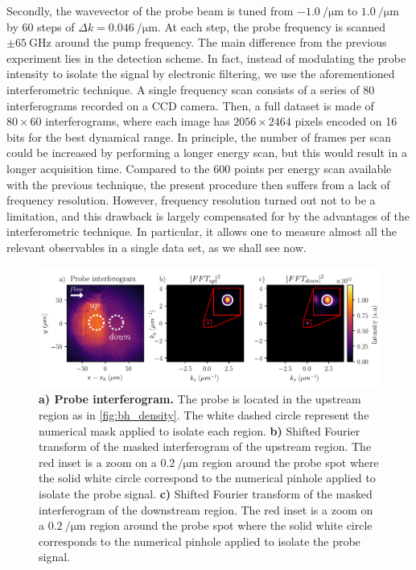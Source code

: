 Secondly, the wavevector of the probe beam is tuned from $\SI{-1.0}{\per \micro \meter}$ to $\SI{1.0}{\per \micro \meter}$ by 60 steps of $\Delta k =\SI{0.046}{\per \micro \meter}$.
At each step, the probe frequency is scanned $\pm \SI{65}{\giga \hertz}$ around the pump frequency. The main difference from the previous experiment lies in the detection scheme. In fact, instead of modulating the probe intensity to isolate the signal by electronic filtering, we use the aforementioned interferometric technique. A single frequency scan consists of a series of 80 interferograms recorded on a CCD camera. Then, a full dataset is made of $80\times 60$ interferograms, where each image has $2056\times 2464$ pixels encoded on 16 bits
for the best dynamical range. In principle, the number of frames per scan could be increased by performing a longer energy scan, but this would result in a longer acquisition time. Compared to the $600$ points per energy scan available with the previous technique,
the present procedure then suffers from a lack of frequency resolution. However, frequency resolution turned out not to be a limitation, and this drawback
is largely compensated for by the advantages of the interferometric technique. In particular, it allows one to measure almost all the relevant observables in a single data set, as we shall see now. 

\begin{figure}
    \centering
    \includegraphics[width=1\textwidth]{chap_stimulated_hawking/fig/fft_bh_fluctu.pdf}
    \caption{\textbf{a) Probe interferogram.} The probe is located in the upstream region as in \autoref{fig:bh_density}. The white dashed circle represent the numerical mask applied to isolate each region.
    \textbf{b)} Shifted Fourier transform of the masked interferogram of the upstream region. The red inset is a zoom on a $\SI{0.2}{\per \micro \meter}$ region around the probe spot where the solid white circle correspond to the numerical pinhole applied to isolate the probe signal.
    \textbf{c)} Shifted Fourier transform of the masked interferogram of the downstream region. The red inset is a zoom on a $\SI{0.2}{\per \micro \meter}$ region around the probe spot where the solid white circle corresponds to the numerical pinhole applied to isolate the probe signal.}
    \label{fig:fft_bh_fluctu}
\end{figure}

